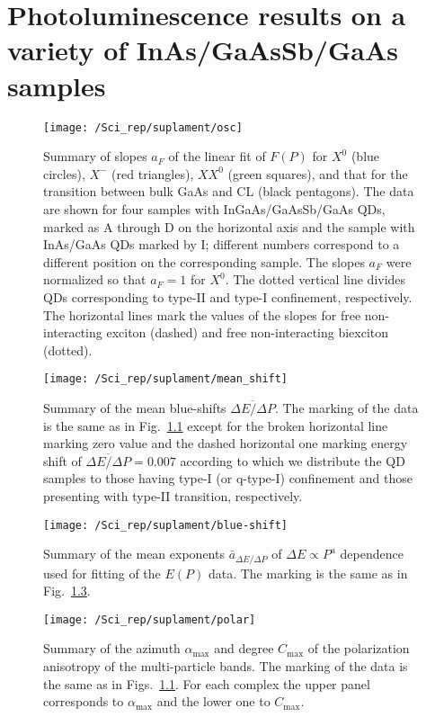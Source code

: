 \chapter{Photoluminescence results on a variety of InAs/GaAsSb/GaAs samples}


\label{chapter:appendix_SciRep}
\begin{figure}
	\centering
	\texttt{[image: /Sci\_rep/suplament/osc]}
	\caption{Summary of slopes $a_F$ of the linear fit of $F(P)$ for $X^0$ (blue circles), $X^-$ (red triangles), $XX^0$ (green squares), and that for the transition between bulk GaAs and CL (black pentagons). The data are shown for four samples with InGaAs/GaAsSb/GaAs QDs, marked as A through D on the horizontal axis and the sample with InAs/GaAs QDs marked by I; different numbers correspond to a different position on the corresponding sample. The slopes $a_F$ were normalized so that $a_F=1$ for $X^0$. The dotted vertical line divides QDs corresponding to type-II and type-I confinement, respectively. The horizontal lines mark the values of the slopes for free non-interacting exciton (dashed) and free non-interacting biexciton (dotted).}
	\label{fig:sup:osc_slope}
\end{figure}




\begin{figure}
	\centering
	\texttt{[image: /Sci\_rep/suplament/mean\_shift]}
	\caption{Summary of the mean blue-shifts $\overline{\Delta E/\Delta P}$. The marking of the data is the same as in Fig.~\ref{fig:sup:osc_slope} except for the broken horizontal line marking zero value and the dashed horizontal one marking energy shift of $\overline{\Delta E/\Delta P}=0.007$ according to which we distribute the QD samples to those having type-I (or q-type-I) confinement and those presenting with type-II transition, respectively.}
	\label{fig:sup:mean_blueshift}
\end{figure}

\begin{figure}
	\centering
	\texttt{[image: /Sci\_rep/suplament/blue-shift]}
	\caption{Summary of the mean exponents $\bar{a}_{\Delta E/\Delta P}$ of $\Delta E\propto P^a$ dependence used for fitting of the $E(P)$ data. The marking is the same as in Fig.~\ref{fig:sup:mean_a_blueshift}.}
	\label{fig:sup:mean_a_blueshift}
\end{figure}



\begin{figure}
	\centering
	\texttt{[image: /Sci\_rep/suplament/polar]}
	\caption{Summary of the azimuth $\alpha_{\mathrm{max}}$ and degree $C_{\mathrm{max}}$ of the polarization anisotropy of the multi-particle bands. The marking of the data is the same as in Figs.~\ref{fig:sup:osc_slope}. For each complex the upper panel corresponds to $\alpha_{\mathrm{max}}$ and the lower one to $C_{\mathrm{max}}$.}
	\label{fig:sup:pol}
\end{figure}
\newpage 